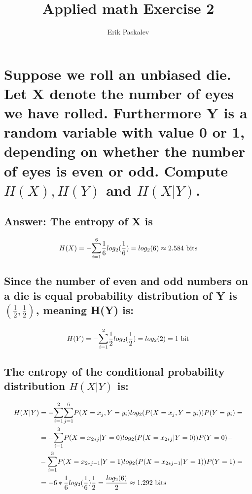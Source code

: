 \documentclass[11px]{article}
\title{Applied math Exercise 2}
\author{Erik Paskalev}
\begin{document}
\maketitle

\section{\normalfont Suppose we roll an unbiased die. Let X denote the number of eyes we have rolled. Furthermore Y is a random variable with value 0 or 1, depending on whether the number of eyes is even or odd. Compute \(H(X),H(Y)\) and \(H(X|Y)\). }

\subsection*{Answer: The entropy of X is}

\begin{equation}
H(X) = -\mathlarger{\sum}_{i=1}^{6} \frac{1}{6}log_2(\frac{1}{6}) = log_2(6) \approx 2.584 \text{ bits}
\end{equation}

\subsection*{Since the number of even and odd numbers on a die is equal probability distribution of Y is \((\frac{1}{2}, \frac{1}{2})\), meaning H(Y) is:}

\begin{equation}
H(Y) = -\mathlarger{\sum}_{i=1}^{2} \frac{1}{2}log_2(\frac{1}{2}) = log_2(2) = 1 \text{ bit}
\end{equation}

\subsection*{The entropy of the conditional probability distribution \(H(X|Y)\) is:}

\begin{equation}
\begin{split}
H(X|Y) & = -\mathlarger{\sum}_{i=1}^{2} \mathlarger{\sum}_{j=1}^{6} 
P(X = x_j, Y = y_i)log_2(P(X = x_j, Y = y_i))P(Y = y_i) = \\
& = -\mathlarger{\sum}_{i=1}^{3} P(X = x_{2*j}|Y = 0)log_2(P(X = x_{2*j}|Y = 0))P(Y = 0) - \\ 
& -\mathlarger{\sum}_{i=1}^{3} P(X = x_{2*j-1}|Y = 1)log_2(P(X = x_{2*j-1}|Y = 1))P(Y = 1) = \\ 
& = -6*\frac{1}{6}log_2(\frac{1}{6})\frac{1}{2} = \frac{log_2(6)}{2} \approx 1.292 \text{ bits}
\end{split}
\end{equation}
\end{document}
